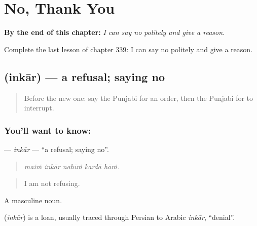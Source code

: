
\chapter{No, Thank You}
\label{ch:pa-a2-no-thank-you}

\begin{chapteropening}
\textbf{By the end of this chapter:} \emph{I can say no politely and give a reason.}

Complete the last lesson of chapter 339: I can say no politely and give a reason.
\end{chapteropening}

\section[\texorpdfstring{\pa{ਇਨਕਾਰ} (inkār)}{ਇਨਕਾਰ (inkār)}]{ (inkār) — a refusal; saying no}

\label{lesson:PA-C339-inkar}



\begin{quote}
Before the new one: say the Punjabi for an order, then the Punjabi for to interrupt.
\end{quote}

\subsection*{You'll want to know: }
\textbf{} — \emph{inkār} — \textquotedblleft{}a refusal; saying no\textquotedblright{}.

\begin{quote}
    
\end{quote}

\begin{quote}
\emph{maiṁ inkār nahīṁ kardā hāṁ.}
\end{quote}

\begin{quote}
I am not refusing.
\end{quote}

A masculine noun.

\begin{cousinweb}
\textbf{} (\emph{inkār}) is a loan, usually traced through Persian to Arabic \emph{inkār}, \textquotedblleft{}denial\textquotedblright{}.
\end{cousinweb}

